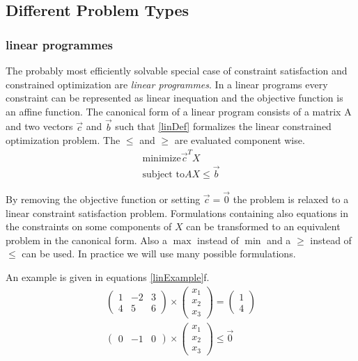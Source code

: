 \subsection{Different Problem Types}
\subsubsection{linear programmes}
The probably most efficiently solvable special case of constraint satisfaction and constrained optimization are \emph{linear programmes}. In a linear programs every constraint can be represented as linear inequation and the objective function is an affine function. 
The canonical form of a linear program consists of a matrix $\mathrm{A}$ and two vectors $\vec{c}$ and $\vec{b}$ such that \ref{linDef} formalizes the linear constrained optimization problem. The $\leq$ and $\geq$ are evaluated component wise.
\begin{eqnarray}
\label{linDef}
\text{minimize} \vec{c}^TX \\
\text{subject to} AX\leq\vec{b}
\end{eqnarray}

By removing the objective function or setting $\vec{c}=\vec{0}$ the problem is relaxed to a linear constraint satisfaction problem. Formulations containing also equations in the constraints on some components of $X$ can be transformed to an equivalent problem in the canonical form. Also a $\max$ instead of $\min$ and a $\geq$ instead of $\leq$ can be used. In practice we will use many possible formulations.

An example is given in equations \ref{linExample}f.
\begin{eqnarray}
\label{linExample}
\begin{pmatrix}
1 & -2 & 3 \\
4 & 5 & 6 
\end{pmatrix}\times\begin{pmatrix}
x_1 \\ x_2 \\ x_3
\end{pmatrix} = \begin{pmatrix}
1 \\ 4
\end{pmatrix}\\
\begin{pmatrix}
0&-1&0
\end{pmatrix}\times\begin{pmatrix}
x_1 \\ x_2 \\ x_3
\end{pmatrix}\leq \vec{0}
\end{eqnarray}

